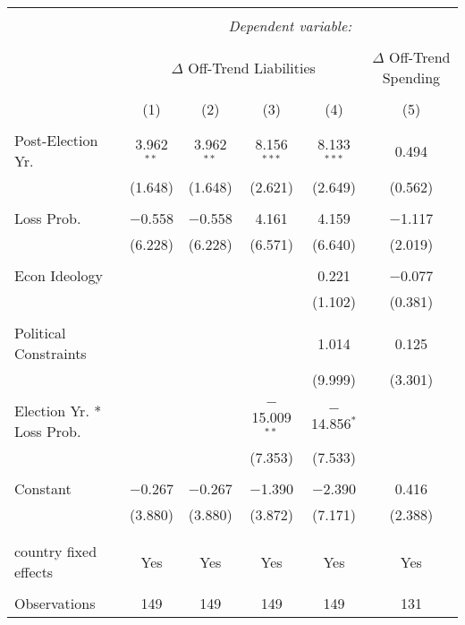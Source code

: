 
\begingroup 
\tiny 
\begin{tabular}{@{\extracolsep{5pt}}lccccc} 
\\[-1.8ex]\hline 
\hline \\[-1.8ex] 
 & \multicolumn{5}{c}{\textit{Dependent variable:}} \\ 
\cline{2-6} 
\\[-1.8ex] & \multicolumn{4}{c}{$\Delta$ Off-Trend Liabilities} & $\Delta$ Off-Trend Spending \\ 
\\[-1.8ex] & (1) & (2) & (3) & (4) & (5)\\ 
\hline \\[-1.8ex] 
 Post-Election Yr. & 3.962$^{**}$ & 3.962$^{**}$ & 8.156$^{***}$ & 8.133$^{***}$ & 0.494 \\ 
  & (1.648) & (1.648) & (2.621) & (2.649) & (0.562) \\ 
  & & & & & \\ 
 Loss Prob. & $-$0.558 & $-$0.558 & 4.161 & 4.159 & $-$1.117 \\ 
  & (6.228) & (6.228) & (6.571) & (6.640) & (2.019) \\ 
  & & & & & \\ 
 Econ Ideology &  &  &  & 0.221 & $-$0.077 \\ 
  &  &  &  & (1.102) & (0.381) \\ 
  & & & & & \\ 
 Political Constraints &  &  &  & 1.014 & 0.125 \\ 
  &  &  &  & (9.999) & (3.301) \\ 
  & & & & & \\ 
 Election Yr. * Loss Prob. &  &  & $-$15.009$^{**}$ & $-$14.856$^{*}$ &  \\ 
  &  &  & (7.353) & (7.533) &  \\ 
  & & & & & \\ 
 Constant & $-$0.267 & $-$0.267 & $-$1.390 & $-$2.390 & 0.416 \\ 
  & (3.880) & (3.880) & (3.872) & (7.171) & (2.388) \\ 
  & & & & & \\ 
\hline \\[-1.8ex] 
country fixed effects & Yes & Yes & Yes & Yes & Yes \\ 
\hline \\[-1.8ex] 
Observations & 149 & 149 & 149 & 149 & 131 \\ 

\end{tabular}
